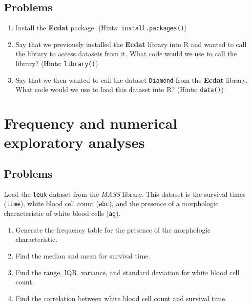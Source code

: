 \documentclass[
]{book}
\providecommand{\tightlist}{%
  \setlength{\itemsep}{0pt}\setlength{\parskip}{0pt}}
\begin{document}
\hypertarget{problems-2}{%
\subsection{Problems}\label{problems-2}}

\begin{enumerate}
\def\labelenumi{\arabic{enumi}.}
\tightlist
\item
  Install the \textbf{Ecdat} package. (Hints: \texttt{install.packages()})
\item
  Say that we previously installed the \textbf{Ecdat} library into R and wanted to call the library to access datasets from it. What code would we use to call the library? (Hints: \texttt{library()})
\item
  Say that we then wanted to call the dataset \texttt{Diamond} from the \textbf{Ecdat} library. What code would we use to load this dataset into R? (Hints: \texttt{data()})
\end{enumerate}

\hypertarget{frequency-and-numerical-exploratory-analyses}{%
\section{Frequency and numerical exploratory analyses}\label{frequency-and-numerical-exploratory-analyses}}

\hypertarget{problems-3}{%
\subsection{Problems}\label{problems-3}}

Load the \texttt{leuk} dataset from the \emph{MASS} library. This dataset is the survival times (\texttt{time}), white blood cell count (\texttt{wbc}), and the presence of a morphologic characteristic of white blood cells (\texttt{ag}).

\begin{enumerate}
\def\labelenumi{\arabic{enumi}.}
\tightlist
\item
  Generate the frequency table for the presence of the morphologic characteristic.
\item
  Find the median and mean for survival time.
\item
  Find the range, IQR, variance, and standard deviation for white blood cell count.
\item
  Find the correlation between white blood cell count and survival time.
\end{enumerate}
\end{document}
